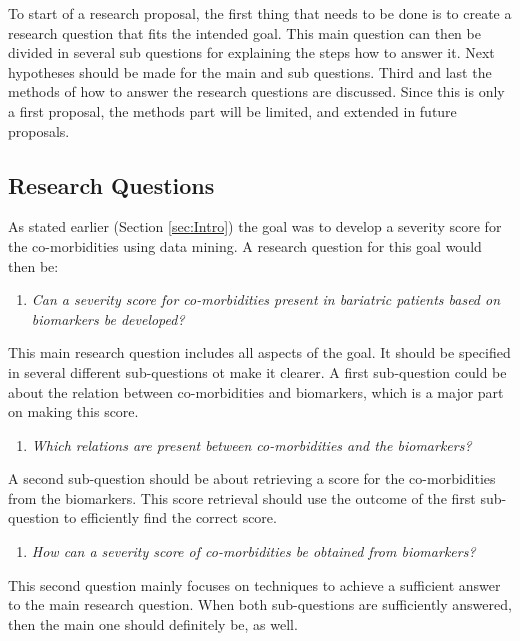 \documentclass[10pt,a4paper]{report}
\begin{document}
	To start of a research proposal, the first thing that needs to be done is to create a research question that fits the intended goal. This main question can then be divided in several sub questions for explaining the steps how to answer it. Next hypotheses should be made for the main and sub questions. Third and last the methods of how to answer the research questions are discussed. Since this is only a first proposal, the methods part will be limited, and extended in future proposals.
	
	\subsection{Research Questions}
	
	As stated earlier (Section \ref{sec:Intro}) the goal was to develop a severity score for the co-morbidities using data mining. A research question for this goal would then be:
	
	\begin{enumerate}
		\item[] \emph{Can a severity score for co-morbidities present in bariatric patients based on biomarkers be developed?}
	\end{enumerate}
	
	This main research question includes all aspects of the goal. It should be specified in several different sub-questions ot make it clearer. A first sub-question could be about the relation between co-morbidities and biomarkers, which is a major part on making this score.
	
	\begin{enumerate}
		\item \emph{Which relations are present between co-morbidities and the biomarkers?}
	\end{enumerate}
	
	A second sub-question should be about retrieving a score for the co-morbidities from the biomarkers. This score retrieval should use the outcome of the first sub-question to efficiently find the correct score.
	
	\begin{enumerate}[resume]
		\item \emph{How can a severity score of co-morbidities be obtained from biomarkers?}
	\end{enumerate}
	
	This second question mainly focuses on techniques to achieve a sufficient answer to the main research question. When both sub-questions are sufficiently answered, then the main one should definitely be, as well.
	
\end{document}
